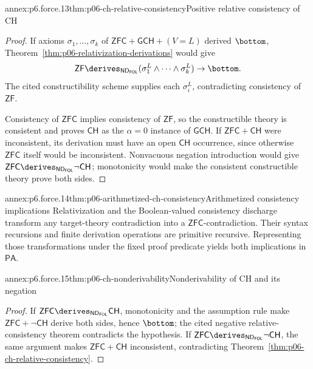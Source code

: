 \begin{annexitem}{annex:p6.force.13}{thm:p06-ch-relative-consistency}{Positive relative consistency of CH}
\begin{proof}
If axioms \(\sigma_1,\ldots,\sigma_k\) of
\(\mathsf{ZFC}+\mathsf{GCH}+(V=L)\) derived \(\bottom\),
Theorem~\ref{thm:p06-relativization-derivations} would give
\[
  \mathsf{ZF}\derives_{\mathsf{ND}_{\mathsf{FOL}}}
  (\sigma_1^L\land\cdots\land\sigma_k^L)\to\bottom.
\]
The cited constructibility scheme supplies each \(\sigma_i^L\), contradicting
consistency of \(\mathsf{ZF}\).

Consistency of \(\mathsf{ZFC}\) implies consistency of \(\mathsf{ZF}\), so
the constructible theory is consistent and proves \(\mathsf{CH}\) as the
\(\alpha=0\) instance of \(\mathsf{GCH}\).  If
\(\mathsf{ZFC}+\mathsf{CH}\) were inconsistent, its derivation must have an
open \(\mathsf{CH}\) occurrence, since otherwise \(\mathsf{ZFC}\) itself
would be inconsistent.  Nonvacuous negation introduction would give
\(\mathsf{ZFC}\derives_{\mathsf{ND}_{\mathsf{FOL}}}\neg\mathsf{CH}\);
monotonicity would make the
consistent constructible theory prove both sides.
\end{proof}
\end{annexitem}

\begin{annexitem}{annex:p6.force.14}{thm:p06-arithmetized-ch-consistency}{Arithmetized consistency implications}
Relativization and the Boolean-valued consistency discharge transform any
target-theory contradiction into a
\(\mathsf{ZFC}\)-contradiction.  Their syntax recursions and finite derivation
operations are primitive recursive.  Representing those transformations under
the fixed proof predicate yields both implications in \(\mathsf{PA}\).
\end{annexitem}

\begin{annexitem}{annex:p6.force.15}{thm:p06-ch-nonderivability}{Nonderivability of CH and its negation}
\begin{proof}
If \(\mathsf{ZFC}\derives_{\mathsf{ND}_{\mathsf{FOL}}}\mathsf{CH}\),
monotonicity and the assumption rule
make \(\mathsf{ZFC}+\neg\mathsf{CH}\) derive both sides, hence
\(\bottom\); the cited negative relative-consistency theorem contradicts the
hypothesis.  If
\(\mathsf{ZFC}\derives_{\mathsf{ND}_{\mathsf{FOL}}}\neg\mathsf{CH}\),
the same argument
makes \(\mathsf{ZFC}+\mathsf{CH}\) inconsistent, contradicting
Theorem~\ref{thm:p06-ch-relative-consistency}.
\end{proof}
\end{annexitem}
